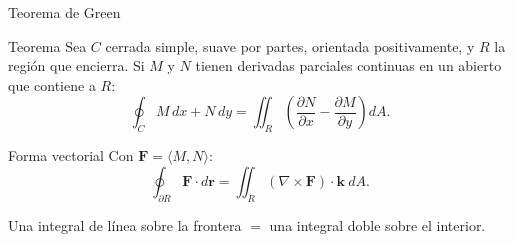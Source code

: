 \documentclass[11pt,aspectratio=169]{beamer}
\begin{document}
\begin{frame}{Teorema de Green}
  \begin{block}{Teorema}
    Sea $C$ cerrada simple, suave por partes, orientada positivamente, y $R$ la región que encierra. Si $M$ y $N$ tienen derivadas parciales continuas en un abierto que contiene a $R$:
    \[
      \oint_C M\,dx+N\,dy
      = \iint_R \left(\frac{\partial N}{\partial x}-\frac{\partial M}{\partial y}\right) dA.
    \]
  \end{block}
  \pause
  \begin{block}{Forma vectorial}
    Con $\mathbf F=\langle M,N\rangle$:
    \[
      \oint_{\partial R}\mathbf F\cdot d\mathbf r
      = \iint_R (\nabla\times\mathbf F)\cdot\mathbf k\ dA.
    \]
  \end{block}
  \pause
  \begin{center}\small\color{gray60}
  Una integral de línea sobre la frontera $=$ una integral doble sobre el interior.
  \end{center}
\end{frame}
\end{document}
